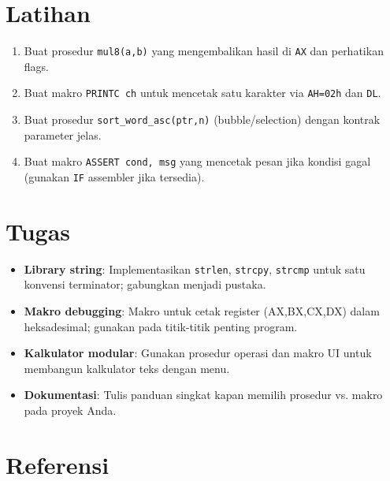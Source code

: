 \section{Latihan}
\begin{enumerate}
  \item Buat prosedur \texttt{mul8(a,b)} yang mengembalikan hasil di \texttt{AX} dan perhatikan flags.
  \item Buat makro \texttt{PRINTC ch} untuk mencetak satu karakter via \texttt{AH=02h} dan \texttt{DL}.
  \item Buat prosedur \texttt{sort\_word\_asc(ptr,n)} (bubble/selection) dengan kontrak parameter jelas.
  \item Buat makro \texttt{ASSERT cond, msg} yang mencetak pesan jika kondisi gagal (gunakan \texttt{IF} assembler jika tersedia).
\end{enumerate}

\section{Tugas}
\begin{itemize}
  \item \textbf{Library string}: Implementasikan \texttt{strlen}, \texttt{strcpy}, \texttt{strcmp} untuk satu konvensi terminator; gabungkan menjadi pustaka.
  \item \textbf{Makro debugging}: Makro untuk cetak register (AX,BX,CX,DX) dalam heksadesimal; gunakan pada titik-titik penting program.
  \item \textbf{Kalkulator modular}: Gunakan prosedur operasi dan makro UI untuk membangun kalkulator teks dengan menu.
  \item \textbf{Dokumentasi}: Tulis panduan singkat kapan memilih prosedur vs. makro pada proyek Anda.
\end{itemize}

\section{Referensi}
